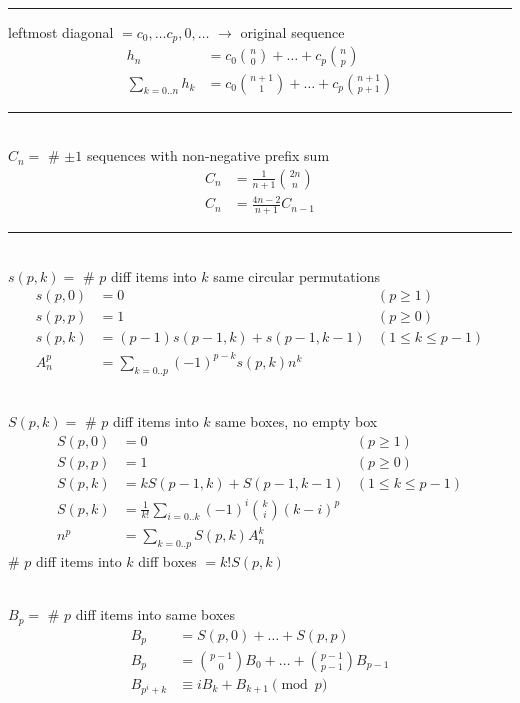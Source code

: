 \documentclass[10pt,letterpaper,landscape]{article}
\begin{document}
\begin{multicols}{2}
\noindent\rule{\linewidth}{1pt}

 leftmost diagonal $= c_0, \hdots c_p, 0, \hdots $ $\rightarrow$ original sequence
\begin{align*}
	h_n &= c_0 \binom{n}{0} + \hdots + c_p \binom{n}{p} \\
	\sum_{k = 0..n}{h_k} &= c_0 \binom{n+1}{1} + \hdots + c_p \binom{n+1}{p+1}
\end{align*}

\noindent\rule{\linewidth}{1pt}

 \\ $C_n =$ \# $\pm 1$ sequences with non-negative prefix sum
\begin{align*}
	C_n &= \frac{1}{n+1} \binom{2n}{n} \\
	C_n &= \frac{4n-2}{n+1} C_{n-1}
\end{align*}

\noindent\rule{\linewidth}{1pt}

 \\ $s(p,k) =$ \# $p$ diff items into $k$ same circular permutations
\begin{align*}
	s(p,0) &= 0 & (p \ge 1) \\
	s(p,p) &= 1 & (p \ge 0) \\
	s(p,k) &= (p-1) s(p-1,k) + s(p-1,k-1) & (1 \le k \le p-1) \\
	A_n^p &= \sum_{k = 0..p}{(-1)^{p-k} s(p,k) n^k}
\end{align*}

 \\ $S(p,k) =$ \# $p$ diff items into $k$ same boxes, no empty box
\begin{align*}
	S(p,0) &= 0 & (p \ge 1) \\
	S(p,p) &= 1 & (p \ge 0) \\
	S(p,k) &= k S(p-1,k) + S(p-1,k-1) & (1 \le k \le p-1) \\
	S(p,k) &= \frac{1}{k!} \sum_{i = 0..k}{(-1)^i \binom{k}{i} (k-i)^p} \\
	n^p &= \sum_{k = 0..p}{S(p,k) A_n^k}
\end{align*}
\# $p$ diff items into $k$ diff boxes $= k! S(p,k)$

 \\ $B_p =$ \# $p$ diff items into same boxes
\begin{align*}
	B_p &= S(p,0) + \hdots + S(p,p) \\
	B_p &= \binom{p-1}{0} B_0 + \hdots + \binom{p-1}{p-1} B_{p-1} \\
	B_{p^i+k} &\equiv i B_k + B_{k+1} \pmod{p}
\end{align*}


\end{multicols}
\end{document}
